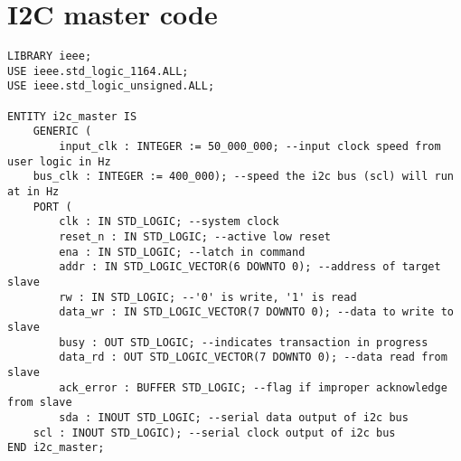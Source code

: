 \section*{I2C master code}
\begin{lstlisting}
LIBRARY ieee;
USE ieee.std_logic_1164.ALL;
USE ieee.std_logic_unsigned.ALL;

ENTITY i2c_master IS
    GENERIC (
        input_clk : INTEGER := 50_000_000; --input clock speed from user logic in Hz
    bus_clk : INTEGER := 400_000); --speed the i2c bus (scl) will run at in Hz
    PORT (
        clk : IN STD_LOGIC; --system clock
        reset_n : IN STD_LOGIC; --active low reset
        ena : IN STD_LOGIC; --latch in command
        addr : IN STD_LOGIC_VECTOR(6 DOWNTO 0); --address of target slave
        rw : IN STD_LOGIC; --'0' is write, '1' is read
        data_wr : IN STD_LOGIC_VECTOR(7 DOWNTO 0); --data to write to slave
        busy : OUT STD_LOGIC; --indicates transaction in progress
        data_rd : OUT STD_LOGIC_VECTOR(7 DOWNTO 0); --data read from slave
        ack_error : BUFFER STD_LOGIC; --flag if improper acknowledge from slave
        sda : INOUT STD_LOGIC; --serial data output of i2c bus
    scl : INOUT STD_LOGIC); --serial clock output of i2c bus
END i2c_master;


\end{lstlisting}
